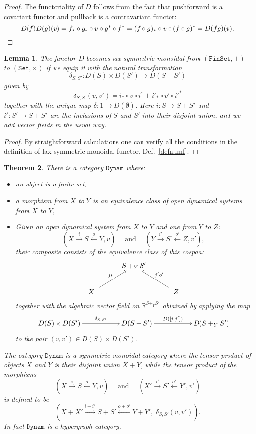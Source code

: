 \documentclass{compositionalityarticle}
\newcommand{\R}{\mathbb{R}}
\newcommand{\FinSet}{\mathtt{FinSet}}
\newcommand{\Set}{\mathtt{Set}}
\newcommand{\Dynam}{\mathtt{Dynam}}
\newcommand{\maps}{\colon}
\theoremstyle{compositionality}
\newtheorem{thm}{Theorem}
\newtheorem{lem}[thm]{Lemma}
\theoremstyle{remark}
\begin{document}
\begin{proof}
The functoriality of $D$ follows from the fact that pushforward is a covariant functor and pullback is a contravariant functor:
\[   D(f)D(g)(v) = f_* \circ g_* \circ v \circ g^* \circ f^* = (f\circ g)_* \circ v \circ (f\circ g)^* = D(fg)(v).  \qedhere \]
\end{proof}

\begin{lem}
\label{lemma:DLax}
The functor $D$ becomes lax symmetric monoidal from $(\FinSet, +)$ to $(\Set, \times)$ if we equip it with the natural transformation 
\[ \delta_{S,S'} \maps D(S) \times D(S') \to D(S + S') \]
given by
\[  \delta_{S,S'}(v,v') = i_* \circ v \circ i^* + i'_* \circ v' \circ {i'}^* \]
together with the unique map $\delta \maps 1 \to D(\emptyset)$.
Here $i \maps S \to S+S'$ and $i' \maps S' \to S+S'$ are the inclusions of $S$ and $S'$ into their disjoint union, and we add vector fields in the usual way.
\end{lem}

\begin{proof}
By straightforward calculations one can verify all the conditions in the definition of lax symmetric monoidal functor, Def.\ \ref{defn.lmf}.   \end{proof}

\begin{thm}
\label{thm:dynam}
There is a category $\Dynam$ where:
\begin{itemize}
\item an object is a finite set,
\item a morphism from $X$ to $Y$ is an equivalence class of open dynamical
systems from $X$ to $Y$, 
\item Given an open dynamical system from $X$ to $Y$ and one from $Y$ to $Z$:
 \[
    (X \stackrel{i}\longrightarrow S \stackrel{o}\longleftarrow Y, v) 
    \quad \textrm{ and } \quad
    (Y \stackrel{i'}\longrightarrow S' \stackrel{o'}\longleftarrow Z, v'), 
  \]
their composite consists of the equivalence class of this cospan:
  \[
    \xymatrix{
      & S +_Y S' \\
      \quad X\quad \ar[ur]^{ji} && \quad Z \quad \ar[ul]_{j'o'}
    }
  \]
together with the algebraic vector field on $\R^{S+_Y S'}$ obtained by applying the map
\[      
\xymatrix{      D(S) \times D(S') \ar[rr]^-{\delta_{S,S'}} && 
                     D(S + S') \ar[rr]^-{D([j,j'])} && D(S +_Y S') } \]
to the pair $(v,v') \in D(S) \times D(S')$.  
\end{itemize}
The category $\Dynam$ is a symmetric monoidal category where the tensor product of objects $X$ and $Y$ is their disjoint union $X + Y$, while the tensor product of the morphisms
\[
    (X \stackrel{i}{\longrightarrow} S \stackrel{o}{\longleftarrow} Y, v) 
    \quad \textrm{ and } \quad
    (X' \stackrel{i'}{\longrightarrow} S' \stackrel{o'}{\longleftarrow} Y', v') 
  \]
is defined to be
\[  ( X + X' \stackrel{i+i'}{\longrightarrow} S + S'  \stackrel{o + o'}{\longleftarrow} Y + Y', \; \delta_{S,S'}(v,v') ) .\]
In fact $\Dynam$ is a hypergraph category.
\end{thm}
\end{document}
